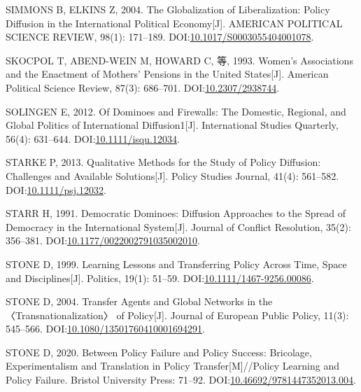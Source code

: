 \documentclass[
  12pt,
]{ctexart}
\newlength{\cslhangindent}
\newlength{\cslentryspacingunit} %
\newenvironment{CSLReferences}[2] %
 {%
  \setlength{\parindent}{0pt}
  \ifodd #1
  \let\oldpar\par
  \def\par{\hangindent=\cslhangindent\oldpar}
  \fi
  \setlength{\parskip}{#2\cslentryspacingunit}
 }%
 {}
\begin{document}
\begin{CSLReferences}{1}{0}
\leavevmode{}%
SIMMONS B, ELKINS Z, 2004. The Globalization of Liberalization: {Policy} Diffusion in the International Political Economy{[}J{]}. AMERICAN POLITICAL SCIENCE REVIEW, 98(1): 171--189. DOI:\href{https://doi.org/10.1017/S0003055404001078}{10.1017/S0003055404001078}.

\leavevmode{}%
SKOCPOL T, ABEND-WEIN M, HOWARD C, 等, 1993. Women's {Associations} and the {Enactment} of {Mothers}' {Pensions} in the {United States}{[}J{]}. American Political Science Review, 87(3): 686--701. DOI:\href{https://doi.org/10.2307/2938744}{10.2307/2938744}.

\leavevmode{}%
SOLINGEN E, 2012. Of {Dominoes} and {Firewalls}: {The Domestic}, {Regional}, and {Global Politics} of {International Diffusion1}{[}J{]}. International Studies Quarterly, 56(4): 631--644. DOI:\href{https://doi.org/10.1111/isqu.12034}{10.1111/isqu.12034}.

\leavevmode{}%
STARKE P, 2013. Qualitative {Methods} for the {Study} of {Policy Diffusion}: {Challenges} and {Available Solutions}{[}J{]}. Policy Studies Journal, 41(4): 561--582. DOI:\href{https://doi.org/10.1111/psj.12032}{10.1111/psj.12032}.

\leavevmode{}%
STARR H, 1991. Democratic {Dominoes}: {Diffusion Approaches} to the {Spread} of {Democracy} in the {International System}{[}J{]}. Journal of Conflict Resolution, 35(2): 356--381. DOI:\href{https://doi.org/10.1177/0022002791035002010}{10.1177/0022002791035002010}.

\leavevmode{}%
STONE D, 1999. Learning {Lessons} and {Transferring Policy} Across {Time}, {Space} and {Disciplines}{[}J{]}. Politics, 19(1): 51--59. DOI:\href{https://doi.org/10.1111/1467-9256.00086}{10.1111/1467-9256.00086}.

\leavevmode{}%
STONE D, 2004. Transfer Agents and Global Networks in the {〈Transnationalization〉} of Policy{[}J{]}. Journal of European Public Policy, 11(3): 545--566. DOI:\href{https://doi.org/10.1080/13501760410001694291}{10.1080/13501760410001694291}.

\leavevmode{}%
STONE D, 2020. Between {Policy Failure} and {Policy Success}: {Bricolage}, {Experimentalism} and {Translation} in {Policy Transfer}{[}M{]}//Policy {Learning} and {Policy Failure}. {Bristol University Press}: 71--92. DOI:\href{https://doi.org/10.46692/9781447352013.004}{10.46692/9781447352013.004}.


\end{CSLReferences}
\end{document}
